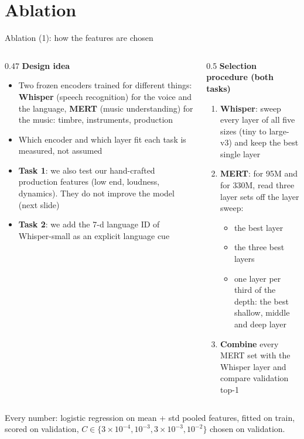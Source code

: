 \documentclass[aspectratio=169,11pt]{beamer}
\newenvironment{tight}{\begin{itemize}\setlength{\itemsep}{1.5pt}\setlength{\parskip}{0pt}\setlength{\topsep}{0pt}}{\end{itemize}}
\begin{document}
\section{Ablation}

\begin{frame}[t,label=ablation]{Ablation (1): how the features are chosen}
  \begin{columns}[T]
    \begin{column}{0.47\textwidth}
      {\small\textbf{Design idea}}
      \begin{tight}\footnotesize
        \item Two frozen encoders trained for different things: \textbf{Whisper} (speech recognition) for the voice and the \alert{language}, \textbf{MERT} (music understanding) for the \alert{music}: timbre, instruments, production
        \item Which encoder and which layer fit each task is measured, not assumed
        \item \textbf{Task 1}: we also test our hand-crafted production features (low end, loudness, dynamics). They do \alert{not} improve the model (next slide)
        \item \textbf{Task 2}: we add the 7-d language ID of Whisper-small as an explicit language cue
      \end{tight}
    \end{column}
    \begin{column}{0.5\textwidth}
      {\small\textbf{Selection procedure (both tasks)}}
      \begin{enumerate}\footnotesize\setlength{\itemsep}{2pt}
        \item \textbf{Whisper}: sweep every layer of all five sizes (tiny to large-v3) and keep the best single layer
        \item \textbf{MERT}: for 95M and for 330M, read three layer sets off the layer sweep:
          \begin{itemize}\footnotesize
            \item the best layer
            \item the three best layers
            \item one layer per third of the depth: the best shallow, middle and deep layer
          \end{itemize}
        \item \textbf{Combine} every MERT set with the Whisper layer and compare validation top-1
      \end{enumerate}
    \end{column}
  \end{columns}
  \vspace{0.2em}
  {\scriptsize\color{gray}Every number: logistic regression on mean + std pooled features, fitted on train, scored on validation, $C \in \{3{\times}10^{-4}, 10^{-3}, 3{\times}10^{-3}, 10^{-2}\}$ chosen on validation.\par}
\end{frame}
\end{document}
